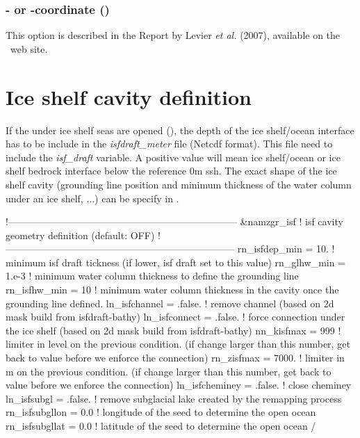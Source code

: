 \documentclass[../main/NEMO_manual]{subfiles}
\begin{document}
\subsubsection[\zstar- or \sstar-coordinate (\forcode{ln_linssh})]{\zstar- or \sstar-coordinate (\protect{})}
\label{subsec:DOMCFG_zgr_star}

This option is described in the Report by Levier \textit{et al.} (2007), available on the \NEMO\ web site.

\section{Ice shelf cavity definition}
\label{subsec:zgrisf}

  If the under ice shelf seas are opened (), the depth of the ice shelf/ocean interface has to be include in 
  the \textit{isfdraft\_meter} file (Netcdf format). This file need to include the \textit{isf\_draft} variable. 
  A positive value will mean ice shelf/ocean or ice shelf bedrock interface below the reference 0m ssh. 
  The exact shape of the ice shelf cavity (grounding line position and minimum thickness of the water column under an ice shelf, ...) can be specify in .

\begin{listing}
  \caption{}
  \label{lst:namzgr_isf}
  \begin{forlines}
!-----------------------------------------------------------------------
&namzgr_isf    !   isf cavity geometry definition                       (default: OFF)
!-----------------------------------------------------------------------
   rn_isfdep_min    = 10.         ! minimum isf draft tickness (if lower, isf draft set to this value)
   rn_glhw_min      = 1.e-3       ! minimum water column thickness to define the grounding line
   rn_isfhw_min     = 10          ! minimum water column thickness in the cavity once the grounding line defined.
   ln_isfchannel    = .false.     ! remove channel (based on 2d mask build from isfdraft-bathy)
   ln_isfconnect    = .false.     ! force connection under the ice shelf (based on 2d mask build from isfdraft-bathy)
      nn_kisfmax       = 999         ! limiter in level on the previous condition. (if change larger than this number, get back to value before we enforce the connection)
      rn_zisfmax       = 7000.       ! limiter in m     on the previous condition. (if change larger than this number, get back to value before we enforce the connection)
   ln_isfcheminey   = .false.     ! close cheminey
   ln_isfsubgl      = .false.     ! remove subglacial lake created by the remapping process
      rn_isfsubgllon   =    0.0      !  longitude of the seed to determine the open ocean
      rn_isfsubgllat   =    0.0      !  latitude  of the seed to determine the open ocean
/
  \end{forlines}
\end{listing}
\end{document}
